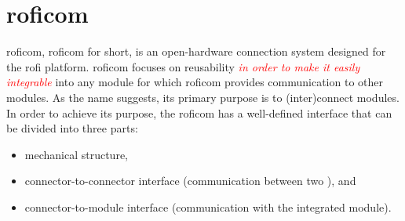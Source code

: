 \documentclass[
  digital,     %
  oneside,     %
  nosansbold,  %
  nocolorbold, %
  nolof,         %
  nolot,         %
]{fithesis4}
\newcommand{\TODO}[1]{\textcolor{red}{\textit{#1}}}
\newcommand{\TODOLIST}[1]{}
\begin{document}
\section[ RoFI Communication Mechanism ]{ \acrlong{roficom} } \label{sec:roficom}
\TODOLIST{
\begin{itemize}
    \item Explain \acrshort{roficom}
    \item Describe components --- shirt, clip and body
    \item Describe board --- RAM: 36KB, Flash: 128KB, ...
\end{itemize}
}

\acrlong{roficom}, \acrshort{roficom} for short, is an open-hardware connection system designed for the \acrshort{rofi} platform. \acrshort{roficom} focuses on reusability \TODO{in order to make it easily integrable} into any module for which \acrshort{roficom} provides
communication to other modules. As the name suggests, its primary purpose is to (inter)connect modules. In order to achieve its purpose, the \acrshort{roficom} has a well-defined interface that can be divided into three parts:
\begin{itemize}
    \item mechanical structure,
    \item connector-to-connector interface (communication between two ), and
    \item connector-to-module interface (communication with the integrated module).
\end{itemize}
\end{document}
